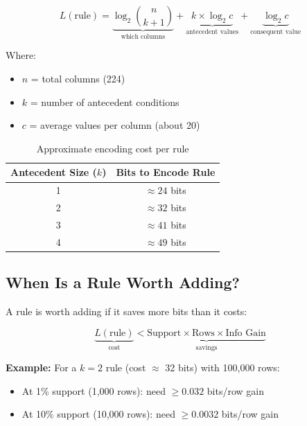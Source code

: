 \documentclass[11pt,a4paper]{article}
\begin{document}
\begin{equation}
L(\text{rule}) = \underbrace{\log_2 \binom{n}{k+1}}_{\text{which columns}} + \underbrace{k \times \log_2 c}_{\text{antecedent values}} + \underbrace{\log_2 c}_{\text{consequent value}}
\end{equation}

Where:
\begin{itemize}
    \item $n$ = total columns (224)
    \item $k$ = number of antecedent conditions
    \item $c$ = average values per column (about 20)
\end{itemize}

\begin{table}[h]
\centering
\caption{Approximate encoding cost per rule}
\begin{tabular}{@{}cc@{}}
\toprule
\textbf{Antecedent Size ($k$)} & \textbf{Bits to Encode Rule} \\
\midrule
1 & $\approx 24$ bits \\
2 & $\approx 32$ bits \\
3 & $\approx 41$ bits \\
4 & $\approx 49$ bits \\
\bottomrule
\end{tabular}
\label{tab:encoding_cost}
\end{table}

\subsection{When Is a Rule Worth Adding?}

A rule is worth adding if it saves more bits than it costs:

\begin{equation}
\underbrace{L(\text{rule})}_{\text{cost}} < \underbrace{\text{Support} \times \text{Rows} \times \text{Info Gain}}_{\text{savings}}
\end{equation}

\textbf{Example:} For a $k=2$ rule (cost $\approx$ 32 bits) with 100,000 rows:
\begin{itemize}
    \item At 1\% support (1,000 rows): need $\geq 0.032$ bits/row gain
    \item At 10\% support (10,000 rows): need $\geq 0.0032$ bits/row gain
\end{itemize}

\end{document}
